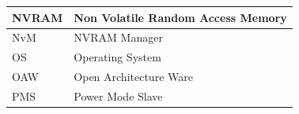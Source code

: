 \begin{longtable}{|l|l|}
\begin{minipage}{0.31\linewidth}\raggedright\vspace{.75ex}NVRAM\vspace{.75ex}\end{minipage} & \begin{minipage}{0.63\linewidth}\raggedright\vspace{.75ex}Non Volatile Random Access Memory\vspace{.75ex}\end{minipage}\\\hline
\begin{minipage}{0.31\linewidth}\raggedright\vspace{.75ex}NvM\vspace{.75ex}\end{minipage} & \begin{minipage}{0.63\linewidth}\raggedright\vspace{.75ex}NVRAM Manager\vspace{.75ex}\end{minipage}\\\hline
\begin{minipage}{0.31\linewidth}\raggedright\vspace{.75ex}OS\vspace{.75ex}\end{minipage} & \begin{minipage}{0.63\linewidth}\raggedright\vspace{.75ex}Operating System\vspace{.75ex}\end{minipage}\\\hline
\begin{minipage}{0.31\linewidth}\raggedright\vspace{.75ex}OAW\vspace{.75ex}\end{minipage} & \begin{minipage}{0.63\linewidth}\raggedright\vspace{.75ex}Open Architecture Ware\vspace{.75ex}\end{minipage}\\\hline
\begin{minipage}{0.31\linewidth}\raggedright\vspace{.75ex}PMS\vspace{.75ex}\end{minipage} & \begin{minipage}{0.63\linewidth}\raggedright\vspace{.75ex}Power Mode Slave\vspace{.75ex}\end{minipage}\\\hline

\end{longtable}
